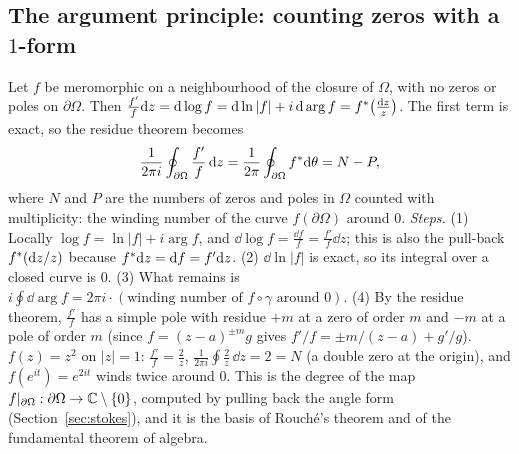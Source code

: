 \subsection{The argument principle: counting zeros with a $1$-form}\label{sec:argument}

Let $f$ be meromorphic on a neighbourhood of the closure of $\Omega$, with no zeros or poles on $\partial\Omega$. Then $\frac{f'}f\mathrm{d} z=\mathrm{d}\log f=\mathrm{d}\ln|f|+i\,\mathrm{d}\arg f=f{}^{*}\bigl(\frac{\mathrm{d} z}z\bigr)$. The first term is exact, so the residue theorem becomes
\begin{equation}\label{eq:argument}
\frac1{2\pi i}\oint_{\partial\Omega}\frac{f'}f\,\dd z=\frac1{2\pi}\oint_{\partial\Omega}f\pb\dd\theta=N-P,
\end{equation}
where $N$ and $P$ are the numbers of zeros and poles in $\Omega$ counted with multiplicity: the winding number of the curve $f(\partial\Omega)$ around $0$.
\emph{Steps.} (1) Locally $\log f=\ln|f|+i\arg f$, and $\dd\log f=\frac{\dd f}f=\frac{f'}f\dd z$; this is also the pull-back $f{}^{*}(\mathrm{d} z/z)$ because $f{}^{*}\mathrm{d} z=\mathrm{d} f=f'\mathrm{d} z$. (2) $\dd\ln|f|$ is exact, so its integral over a closed curve is $0$. (3) What remains is $i\oint\dd\arg f=2\pi i\cdot(\text{winding number of }f\circ\gamma\text{ around }0)$.
(4) By the residue theorem, $\frac{f'}f$ has a simple pole with residue $+m$ at a zero of order $m$ and $-m$ at a pole of order $m$ (since $f=(z-a)^{\pm m}g$ gives $f'/f=\pm m/(z-a)+g'/g$).
\numcheck $f(z)=z^2$ on $|z|=1$: $\frac{f'}f=\frac2z$, $\frac1{2\pi i}\oint\frac2z\,\dd z=2=N$ (a double zero at the origin), and $f(e^{it})=e^{2it}$ winds twice around $0$.
This is the degree of the map $f|_{\partial\Omega}:\partial\Omega\to\mathbb{C}\setminus\{0\}$, computed by pulling back the angle form (Section~\ref{sec:stokes}), and it is the basis of Rouch\'e's theorem and of the fundamental theorem of algebra.


